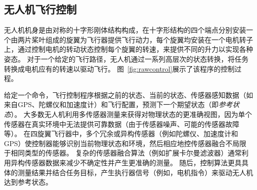
\subsection{无人机飞行控制}\label{moti:pre_study}
无人机机身是由对称的十字形刚体结构构成，在十字形结构的四个端点分别安装一个由两片桨叶组成的旋翼为飞行器提供飞行动力，每个旋翼均安装在一个电机转子上，通过控制电机的转动状态控制每个旋翼的转速，来提供不同的升力以实现各种姿态。
对于一个给定的飞行路径，无人机通过一系列高层次的状态转换，将任务转换成电机应有的转速以驱动飞行。
图~\ref{fig:rawcontrol}展示了该程序的控制过程。

给定一个命令，飞行控制程序根据之前的状态、当前的状态、传感器感知数据（如来自GPS、陀螺仪和加速度计）和飞行配置，预测下一个期望状态（即\emph{参考状态}）。
大多数无人机利用多传感器测量来获得对物理状态的更准确视图，因为单个传感器在真实环境中无法提供可靠数据（由于传感器噪声、可能的传感器故障等）。
在四旋翼飞行器中，多个冗余或异构传感器（例如陀螺仪、加速度计和GPS）使控制器能够识别当前物理状态和环境，然后相应地控传感器融合不局限于相同类型的传感器。
复杂的传感器融合算法（例如扩展卡尔曼滤波器）通常利用异构传感器数据来减少不确定性并产生更准确的测量。
随后，控制算法更具具体的测量结果并结合任务目标，产生执行器信号（例如，电机指令）来驱动无人机达到参考状态。


